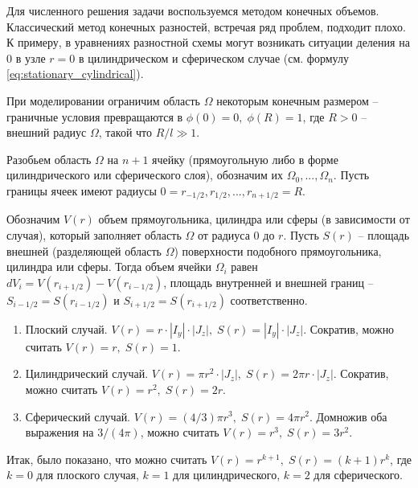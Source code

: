 Для численного решения задачи воспользуемся методом конечных объемов. Классический метод конечных разностей, встречая ряд проблем, подходит плохо. К примеру, в уравнениях разностной схемы могут возникать ситуации деления на 0 в узле $r = 0$ в цилиндрическом и сферическом случае (см. формулу \eqref{eq:stationary_cylindrical}).

При моделировании ограничим область $\Omega$ некоторым конечным размером -- граничные условия превращаются в $\phi(0) = 0, \; \phi(R) = 1$, где $R > 0$ -- внешний радиус $\Omega$, такой что $R / l \gg 1$.

Разобьем область $\Omega$ на $n + 1$ ячейку (прямоугольную либо в форме цилиндрического или сферического слоя), обозначим их $\Omega_0, ..., \Omega_n$. Пусть границы ячеек имеют радиусы $0 = r_{-1/2}, r_{1/2}, ..., r_{n + 1/2} = R$.

Обозначим $V(r)$ объем прямоугольника, цилиндра или сферы (в зависимости от случая), который заполняет область $\Omega$ от радиуса $0$ до $r$. Пусть $S(r)$ -- площадь внешней (разделяющей область $\Omega$) поверхности подобного прямоугольника, цилиндра или сферы. Тогда объем ячейки $\Omega_i$ равен $dV_i = V(r_{i + 1/2}) - V(r_{i - 1/2})$, площадь внутренней и внешней границ -- $S_{i - 1/2} = S(r_{i - 1/2})$ и $S_{i + 1/2} = S(r_{i + 1/2})$ соответственно.

\begin{enumerate}[label=\arabic*.]
	\item Плоский случай. $V(r) = r \cdot |I_y| \cdot |J_z|, \; S(r) = |I_y| \cdot |J_z|$. Сократив, можно считать $V(r) = r, \; S(r) = 1$.
	\item Цилиндрический случай. $V(r) = \pi r^2 \cdot |J_z|, \; S(r) = 2 \pi r \cdot |J_z|$. Сократив, можно считать $V(r) = r^2, \; S(r) = 2r$.
	\item Сферический случай. $V(r) = (4/3) \pi r^3, \; S(r) = 4 \pi r^2$. Домножив оба выражения на $3/(4\pi)$, можно считать $V(r) = r^3, \; S(r) = 3 r^2$.
\end{enumerate}

Итак, было показано, что можно считать $V(r) = r^{k + 1}, \; S(r) = (k + 1)r^k$, где $k = 0$ для плоского случая, $k = 1$ для цилиндрического, $k = 2$ для сферического.

